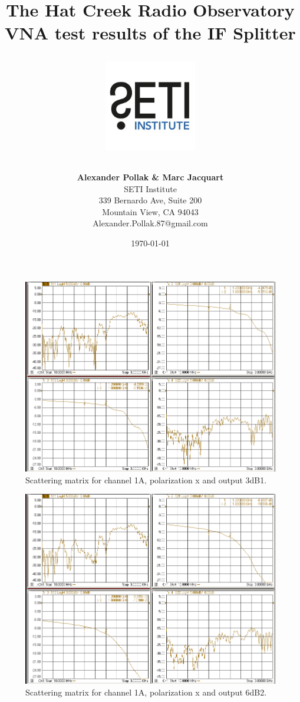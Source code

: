 \documentclass[12pt,a4paper,oneside]{article}
\title{\Huge The Hat Creek Radio Observatory\\
\vspace{0.5cm}
VNA test results of the IF Splitter\\
\vspace{0.5cm}
\normalsize \emph{}
\vspace{3.5cm}
\begin{center}
\includegraphics[height=4cm]{titlepage/SETI_institute_logo.jpg}
\end{center}
}
\author{ 
\vspace{1cm}
\Large
\textbf{ Alexander Pollak \& Marc Jacquart} \\
SETI Institute \\ 
339 Bernardo Ave, Suite 200 \\
Mountain View, CA 94043 \\ 
Alexander.Pollak.87@gmail.com\\
}
\date{\today}
\begin{document}
\clearpage\maketitle
\thispagestyle{empty}

\newpage

\begin{figure}[H]
\centering
\includegraphics[width=0.9\linewidth]{VNA_results/1Ax_3dB1.png}
\caption{Scattering matrix for channel 1A, polarization x and output 3dB1.}
\label{fig:1Ax_3dB1}
\end{figure}


\begin{figure}[H]
\centering
\includegraphics[width=0.9\linewidth]{VNA_results/1Ax_6dB2.png}
\caption{Scattering matrix for channel 1A, polarization x and output 6dB2.}
\label{fig:1Ax_6dB2}
\end{figure}
\end{document}
